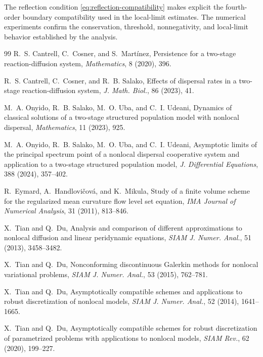 \documentclass[11pt]{article}
\theoremstyle{definition}
\begin{document}
The reflection condition \eqref{eq:reflection-compatibility} makes explicit
the fourth-order boundary compatibility used in the local-limit estimates.
The numerical experiments confirm the conservation, threshold, nonnegativity,
and local-limit behavior established by the analysis.


\begin{thebibliography}{99}
R.~S. Cantrell, C.~Cosner, and S.~Mart\'inez,
\newblock Persistence for a two-stage reaction-diffusion system,
\newblock \emph{Mathematics}, 8 (2020), 396.


R.~S. Cantrell, C.~Cosner, and R.~B. Salako,
\newblock Effects of dispersal rates in a two-stage reaction-diffusion system,
\newblock \emph{J. Math. Biol.}, 86 (2023), 41.
  
M.~A. Onyido, R.~B. Salako, M.~O. Uba, and C.~I. Udeani,
\newblock Dynamics of classical solutions of a two-stage structured population model with nonlocal dispersal,
\newblock \emph{Mathematics}, 11 (2023), 925.

M.~A. Onyido, R.~B. Salako, M.~O. Uba, and C.~I. Udeani,
\newblock Asymptotic limits of the principal spectrum point of a nonlocal dispersal cooperative system and application to a two-stage structured population model,
\newblock \emph{J. Differential Equations}, 388 (2024), 357--402.


R.~Eymard, A.~Handlovi\v{c}ov\'a, and K.~Mikula,
\newblock Study of a finite volume scheme for the regularized mean curvature flow level set equation,
\newblock \emph{IMA Journal of Numerical Analysis}, 31 (2011), 813--846.

X.~Tian and Q.~Du,
\newblock Analysis and comparison of different approximations to nonlocal diffusion and linear peridynamic equations,
\newblock \emph{SIAM J. Numer. Anal.}, 51 (2013), 3458--3482.

X.~Tian and Q.~Du,
\newblock Nonconforming discontinuous Galerkin methods for nonlocal variational problems,
\newblock \emph{SIAM J. Numer. Anal.}, 53 (2015), 762--781.

X.~Tian and Q.~Du,
\newblock Asymptotically compatible schemes and applications to robust discretization of nonlocal models,
\newblock \emph{SIAM J. Numer. Anal.}, 52 (2014), 1641--1665.

X.~Tian and Q.~Du,
\newblock Asymptotically compatible schemes for robust discretization of parametrized problems with applications to nonlocal models,
\newblock \emph{SIAM Rev.}, 62 (2020), 199--227.


\end{thebibliography}
\end{document}
